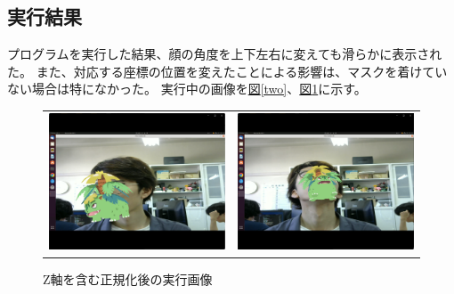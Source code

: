 \documentclass[]{jarticle}          %
\begin{document}
\newpage

\subsection{実行結果}
プログラムを実行した結果、顔の角度を上下左右に変えても滑らかに表示された。
また、対応する座標の位置を変えたことによる影響は、マスクを着けていない場合は特になかった。
実行中の画像を\hyperref[two]{図\ref{two}}、\hyperref[three]{図\ref{three}}に示す。
\begin{figure}[!ht]
  \begin{tabular}{cc}
    \begin{minipage}[t]{0.45\hsize}
      \centering
      \includegraphics[keepaspectratio, scale=0.2]{figures/output1.png}
      \caption{Z軸を含む正規化後の実行画像}
      \label{two}
    \end{minipage} &
    \begin{minipage}[t]{0.45\hsize}
      \centering
      \includegraphics[keepaspectratio, scale=0.2]{figures/output2.png}
      \caption{Z軸を含む正規化後の実行画像}
      \label{three}
    \end{minipage}
  \end{tabular}
\end{figure}
\end{document}
